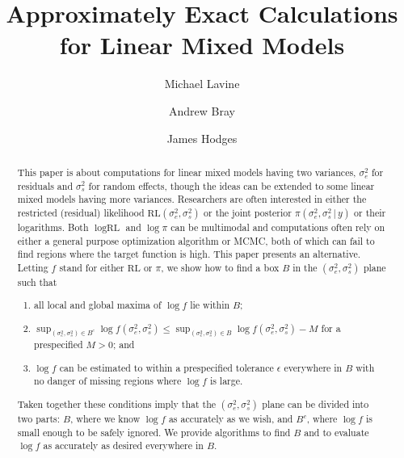 \documentclass{report}
\newcommand{\RLorig}{\text{RL}}
\newcommand{\sigssq}{\sigma_s^2}
\newcommand{\sigesq}{\sigma_e^2}
\newcommand{\g}{\,|\,}
\begin{document}
\title{Approximately Exact Calculations for Linear Mixed Models}
\author[1]{Michael Lavine}
\author[1,2]{Andrew Bray}
\author[3]{James Hodges}

\maketitle

\begin{abstract}
This paper is about computations for linear mixed models having two variances, $\sigma^2_e$ for residuals and $\sigma^2_s$ for random effects, though the ideas can be extended to some linear mixed models having more variances.  Researchers are often interested in either the restricted (residual) likelihood $\RLorig(\sigesq,\sigssq)$ or the joint posterior $\pi(\sigesq,\sigssq\g y)$ or their logarithms.  Both $\log\RLorig$ and $\log\pi$ can be multimodal and computations often rely on either a general purpose optimization algorithm or MCMC, both of which can fail to find regions where the target function is high.  This paper presents an alternative.  Letting $f$ stand for either $\RLorig$ or $\pi$, we show how to find a box $B$ in the $(\sigesq,\sigssq)$ plane such that
\begin{enumerate}
\item all local and global maxima of $\log f$ lie within $B$;
\item $\sup_{(\sigesq,\sigssq) \in B^c} \log f(\sigesq,\sigssq) \le \sup_{(\sigesq,\sigssq) \in B} \log f(\sigesq,\sigssq) - M$ for a prespecified $M>0$; and
\item $\log f$ can be estimated to within a prespecified tolerance $\epsilon$ everywhere in $B$ with no danger of missing regions where $\log f$ is large.
\end{enumerate}
Taken together these conditions imply that the $(\sigesq,\sigssq)$ plane can be divided into two parts: $B$, where we know $\log f$ as accurately as we wish,  and $B^c$, where $\log f$ is small enough to be safely ignored.  We provide algorithms to find $B$ and to evaluate $\log f$ as accurately as desired everywhere in $B$.
\end{abstract}
\end{document}
